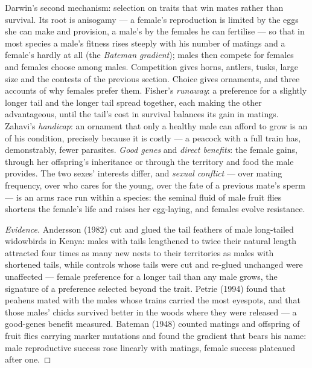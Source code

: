 \begin{definition}\label{def:b3:behavioural-ecology:sexual-selection}
Darwin's second mechanism: selection on traits that win mates rather
than survival. Its root is anisogamy --- a female's reproduction is
limited by the eggs she can make and provision, a male's by the females
he can fertilise --- so that in most species a male's fitness rises
steeply with his number of matings and a female's hardly at all (the
\emph{Bateman gradient}); males then compete for females and females
choose among males. Competition gives horns, antlers, tusks, large
size and the contests of the previous section. Choice gives ornaments,
and three accounts of why females prefer them. Fisher's \emph{runaway}:
a preference for a slightly longer tail and the longer tail spread
together, each making the other advantageous, until the tail's cost in
survival balances its gain in matings. Zahavi's \emph{handicap}: an
ornament that only a healthy male can afford to grow is an  of his condition, precisely because it is costly --- a peacock
with a full train has, demonstrably, fewer parasites. \emph{Good genes}
and \emph{direct benefits}: the female gains, through her offspring's
inheritance or through the territory and food the male provides.
The two sexes' interests differ, and \emph{sexual conflict} --- over
mating frequency, over who cares for the young, over the fate of a
previous mate's sperm --- is an arms race run within a species: the
seminal fluid of male fruit flies shortens the female's life and
raises her egg-laying, and females evolve resistance.
\end{definition}

\begin{proof}[Evidence]
Andersson (1982) cut and glued the tail feathers of male long-tailed
widowbirds in Kenya: males with tails lengthened to twice their natural
length attracted four times as many new nests to their territories as
males with shortened tails, while controls whose tails were cut and
re-glued unchanged were unaffected --- female preference for a longer
tail than any male grows, the signature of a preference selected beyond
the trait. Petrie (1994) found that peahens mated with the males whose
trains carried the most eyespots, and that those males' chicks survived
better in the woods where they were released --- a good-genes benefit
measured. Bateman (1948) counted matings and offspring of fruit flies
carrying marker mutations and found the gradient that bears his name:
male reproductive success rose linearly with matings, female success
plateaued after one.
\end{proof}

